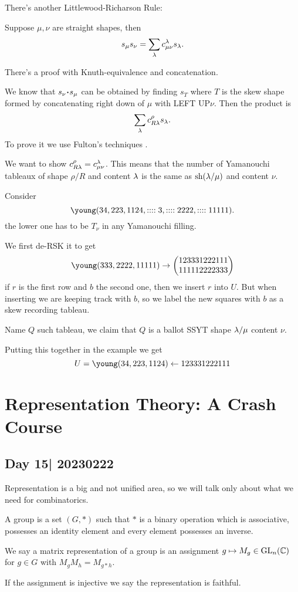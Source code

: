 \documentclass[12pt]{memoir}
\begin{document}
There's another Littlewood-Richarson Rule:

\begin{Th}
    Suppose $\mu,\nu$ are straight shapes, then 
    $$s_\mu s_\nu=\sum_{\lambda}c_{\mu\nu}^\lambda s_\lambda.$$
\end{Th}

There's a proof with Knuth-equivalence and concatenation.\par 
We know that $s_\nu\.s_\mu$ can be obtained by finding $s_T$ where $T$ is the skew shape formed by concatenating right down of $\mu$ with LEFT UP$\nu$. Then the product is 
$$\sum_{\lambda} c_{R\lambda}^\rho s_\lambda.$$
To prove it we use Fulton's techniques \cite{FultonYoungTab}.\par 
We want to show $c_{R\lambda}^{\rho}=c_{\mu\nu}^\lambda$. This means that the number of Yamanouchi tableaux of shape $\rho/R$ and content $\lambda$ is the same as $\operatorname{sh}(\lambda/\mu)$ and content $\nu$. 
\begin{Rmk}
    Consider 
    $$\young(34,223,1124,::::3,::::2222,::::11111).$$
    the lower one has to be $T_\nu$ in any Yamanouchi filling.
\end{Rmk}
We first de-RSK it to get 
$$\young(333,2222,11111)\to \twobyone{123331222111}{111112222333}$$
if $r$ is the first row and $b$ the second one, then we insert $r$ into $U$. But when inserting we are keeping track with $b$, so we label the new squares with $b$ as a skew recording tableau.\par 
Name $Q$ such tableau, we claim that $Q$ is a ballot SSYT shape $\lambda/\mu$ content $\nu$.\par 
Putting this together in the example we get 
$$U=\young(34,223,1124)\leftarrow 123331222111$$

\chapter{Representation Theory: A Crash Course}

\section{Day 15| 20230222}


Representation is a big and not unified area, so we will talk only about what we need for combinatorics.

\begin{Def}
    A group is a set $(G,\ast)$ such that $\ast$ is a binary operation which is associative, possesses an identity element and every element possesses an inverse.\par 
    We say a matrix representation of a group is an assignment $g\mapsto M_g\in\operatorname{GL}_n(\mathbb{C})$ for $g\in G$ with $M_gM_h=M_{g\ast h}$.\par 
    If the assignment is injective we say the representation is faithful.
\end{Def}
\end{document}
